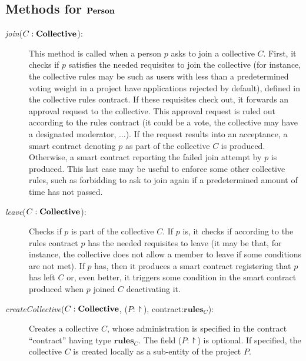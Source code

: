 \documentclass[submission, copyright,creativecommons,sharealike,noncommercial]{eptcs}
\begin{document}
	\subsection{Methods for $\textbf{Person}$}
	\renewcommand{\descriptionlabel}[1]{\hspace{\labelsep}{#1}}
	\begin{description}
		\item[\emph{join}($C:\textbf{Collective}$):] This method is called when a person $p$ asks to join a collective $C$. 
%				
		First, it checks if $p$ satisfies the needed requisites to join the collective (for instance, the collective rules may be such as users with less than a predetermined voting weight in a project have applications rejected by default), defined in the collective rules contract. If these requisites check out, it forwards an approval request to the collective. This approval request is ruled out according to the rules contract (it could be a vote, the collective may have a designated moderator, ...). If the request results into an acceptance, a smart contract denoting $p$ as part of the collective $C$ is produced. Otherwise, a smart contract reporting the failed join attempt by $p$ is produced. This last case may be useful to enforce some other collective rules, such as forbidding to ask to join again if a predetermined amount of time has not passed.
		
		\item[\emph{leave}($C:\textbf{Collective}$):] Checks if $p$ is part of the collective $C$. If $p$ is, it checks if according to the rules contract $p$ has the needed requisites to leave (it may be that, for instance, the collective does not allow a member to leave if some conditions are not met). If $p$ has, then it produces a smart contract registering that $p$ has left $C$ or, even better, it triggers some condition in the smart contract produced when $p$ joined $C$ deactivating it.
		
		\item[\emph{createCollective}($C:\textbf{Collective}$, ($P:\project$), contract:$\textbf{rules}_C$):] Creates a collective $C$, whose administration is specified in the contract ``contract'' having type $\textbf{rules}_C$. The field ($P:\project$) is optional. If specified, the collective $C$ is created locally as a sub-entity of the project $P$.
		

\end{description}
\end{document}

